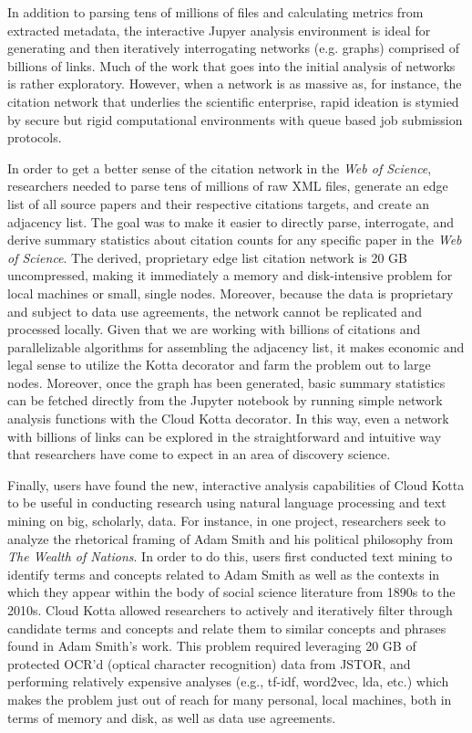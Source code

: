 In addition to parsing tens of millions of files and calculating metrics from extracted metadata, the interactive Jupyer analysis environment is ideal for generating and then iteratively interrogating networks (e.g. graphs) comprised of billions of links. Much of the work that goes into the initial analysis of networks is rather exploratory. However, when a network is as massive as, for instance, the citation network that underlies the scientific enterprise, rapid ideation is stymied by secure but rigid computational environments with queue based job submission protocols. 

In order to get a better sense of the citation network in the {\it Web of Science}, researchers needed to parse tens of millions of raw XML files, generate an edge list of all source papers and their respective citations targets, and create an adjacency list. The goal was to make it easier to directly parse, interrogate, and derive summary statistics about citation counts for any specific paper in the {\it Web of Science}. The derived, proprietary edge list citation network is 20 GB uncompressed, making it immediately a memory and disk-intensive problem for local machines or small, single nodes. Moreover, because the data is proprietary and subject to data use agreements, the network cannot be replicated and processed locally. Given that we are working with billions of citations and parallelizable algorithms for assembling the adjacency list, it makes economic and legal sense to utilize the Kotta decorator and farm the problem out to large nodes. Moreover, once the graph has been generated, basic summary statistics can be fetched directly from the Jupyter notebook by running simple network analysis functions with the Cloud Kotta decorator. In this way, even a network with billions of links can be explored in the straightforward and intuitive way that researchers have come to expect in an area of discovery science.

Finally, users have found the new, interactive analysis capabilities of Cloud Kotta to be useful in conducting research using natural language processing and text mining on big, scholarly, data. For instance, in one project, researchers seek to analyze the rhetorical framing of Adam Smith and his political philosophy from {\it The Wealth of Nations}. In order to do this, users first conducted text mining to identify terms and concepts related to Adam Smith as well as the contexts in which they appear within the body of social science literature from 1890s to the 2010s. Cloud Kotta allowed researchers to actively and iteratively filter through candidate terms and concepts and relate them to similar concepts and phrases found in Adam Smith's work. This problem required leveraging 20 GB of protected OCR'd (optical character recognition) data from JSTOR, and performing relatively expensive analyses (e.g., tf-idf, word2vec, lda, etc.) which makes the problem just out of reach for many personal, local machines, both in terms of memory and disk, as well as data use agreements.

